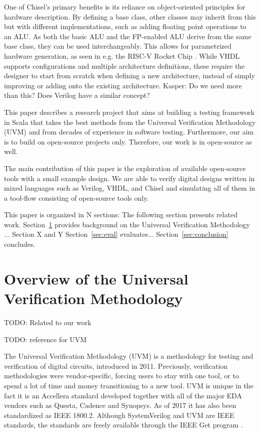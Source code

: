 \documentclass[conference]{IEEEtran}
\newcommand{\todo}[1]{{\color{olive} TODO: #1}}
\newcommand{\kasper}[1]{{\color{purple} Kasper: #1}}
\begin{document}
One of Chisel's primary benefits is its reliance on object-oriented principles for hardware description. By defining a base class, other classes may inherit from this but with different implementations, such as adding floating point operations to an ALU. As both the basic ALU and the FP-enabled ALU derive from the same base class, they can be used interchangeably. This allows for parametrized hardware generation, as seen in e.g. the RISC-V Rocket Chip \cite{Asanovic2016}. While VHDL supports configurations and multiple architecture definitions, these require the designer to start from scratch when defining a new architecture, instead of simply improving or adding onto the existing architecture. \kasper{Do we need more than this? Does Verilog have a similar concept?}

This paper describes a research project that aims at building a testing framework
in Scala that takes the best methods from the Universal Verification Methodology (UVM) and from decades of experience
in software testing.
Furthermore, our aim is to build on open-source projects only. Therefore, our
work is in open-source as well.

The main contribution of this paper is the exploration of available open-source tools
with a small example design. We are able to verify digital designs written in mixed
languages such as Verilog, VHDL, and Chisel and simulating all of them in a tool-flow
consisting of open-source tools only.

This paper is organized in N sections: The following section presents related work.
Section~\ref{sec:related} provides background on the Universal Verification Methodology ...
Section X and Y 
Section~\ref{sec:eval} evaluates...
Section~\ref{sec:conclusion} concludes.


\section{Overview of the Universal Verification Methodology}
\label{sec:related}


\todo{Related to our work}

\todo{reference for UVM}

The Universal Verification Methodology (UVM) is a methodology for testing and verification of digital circuits, introduced in 2011. Previously, verification methodologies were vendor-specific, forcing users to stay with one tool, or to spend a lot of time and money transitioning to a new tool. UVM is unique in the fact it is an Accellera standard developed together with all of the major EDA vendors such as Questa, Cadence and Synopsys. As of 2017 it has also been standardized as IEEE 1800.2. Although SystemVerilog and UVM are IEEE standards, the standards are freely available through the IEEE Get program \cite{IEEE:18002}.
\end{document}

